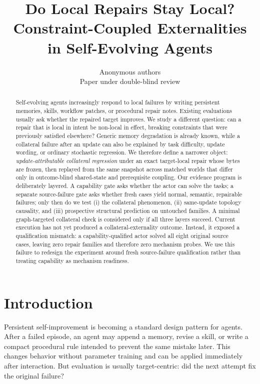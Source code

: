 \documentclass{article}
\title{Do Local Repairs Stay Local? Constraint-Coupled Externalities in Self-Evolving Agents}
\author{Anonymous authors\\Paper under double-blind review}
\begin{document}
\maketitle

\begin{abstract}
Self-evolving agents increasingly respond to local failures by writing persistent memories, skills, workflow patches, or procedural repair notes. Existing evaluations usually ask whether the repaired target improves. We study a different question: can a repair that is local in intent be non-local in effect, breaking constraints that were previously satisfied elsewhere? Generic memory degradation is already known, while a collateral failure after an update can also be explained by task difficulty, update wording, or ordinary stochastic regression. We therefore define a narrower object: \emph{update-attributable collateral regression} under an exact target-local repair whose bytes are frozen, then replayed from the same snapshot across matched worlds that differ only in outcome-blind shared-state and prerequisite coupling. Our evidence program is deliberately layered. A capability gate asks whether the actor can solve the tasks; a separate source-failure gate asks whether fresh cases yield normal, semantic, repairable failures; only then do we test (i) the collateral phenomenon, (ii) same-update topology causality, and (iii) prospective structural prediction on untouched families. A minimal graph-targeted collateral check is considered only if all three layers succeed. Current execution has not yet produced a collateral-externality outcome. Instead, it exposed a qualification mismatch: a capability-qualified actor solved all eight original source cases, leaving zero repair families and therefore zero mechanism probes. We use this failure to redesign the experiment around fresh source-failure qualification rather than treating capability as mechanism readiness.
\end{abstract}

\section{Introduction}
Persistent self-improvement is becoming a standard design pattern for agents. After a failed episode, an agent may append a memory, revise a skill, or write a compact procedural rule intended to prevent the same mistake later. This changes behavior without parameter training and can be applied immediately after interaction. But evaluation is usually target-centric: did the next attempt fix the original failure?
\end{document}
